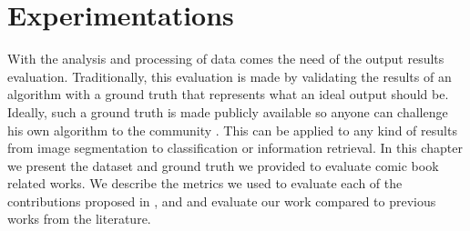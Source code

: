 \chapter{Experimentations}
\label{chap:experimentations}
\graphicspath{{./chapters/6-experiments/figs/}}



With the analysis and processing of data comes the need of the output results evaluation.
Traditionally, this evaluation is made by validating the results of an algorithm with a ground truth that represents what an ideal output should be\cite{pascal-voc-2012, smeaton2006evaluation, griffinHolubPerona}.
Ideally, such a ground truth is made publicly available so anyone can challenge his own algorithm to the community \cite{lamiroy:inria-00537035}.
This can be applied to any kind of results from image segmentation to classification or information retrieval.
In this chapter we present the dataset and ground truth we provided to evaluate comic book related works.
We describe the metrics we used to evaluate each of the contributions proposed in ,  and  and evaluate our work compared to previous works from the literature.






